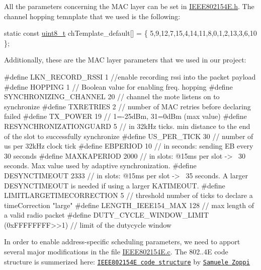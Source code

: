 All the parameters concerning the M\+AC layer can be set in \hyperlink{_i_e_e_e802154_e_8h}{I\+E\+E\+E802154\+E.\+h}. The channel hopping temnplate that we used is the following\+:


\begin{DoxyCodeInclude}
\textcolor{keyword}{static} \textcolor{keyword}{const} \hyperlink{_p_e___types_8h_aba7bc1797add20fe3efdf37ced1182c5}{uint8\_t} chTemplate\_default[] = \{
   5,9,12,7,15,4,14,11,8,0,1,2,13,3,6,10
\};
\end{DoxyCodeInclude}
 Additionally, these are the M\+AC layer parameters that we used in our project\+:


\begin{DoxyCodeInclude}
\textcolor{preprocessor}{#define LKN\_RECORD\_RSSI               1 //enable recording rssi into the packet payload}
\textcolor{preprocessor}{#define HOPPING                      1 // Boolean value for enabling freq. hopping}
\textcolor{preprocessor}{#define SYNCHRONIZING\_CHANNEL       20 // channel the mote listens on to synchronize}
\textcolor{preprocessor}{#define TXRETRIES                    2 // number of MAC retries before declaring failed}
\textcolor{preprocessor}{#define TX\_POWER                     19 // 1=-25dBm, 31=0dBm (max value)}
\textcolor{preprocessor}{#define RESYNCHRONIZATIONGUARD       5 // in 32kHz ticks. min distance to the end of the slot to
       successfully synchronize}
\textcolor{preprocessor}{#define US\_PER\_TICK                 30 // number of us per 32kHz clock tick}
\textcolor{preprocessor}{#define EBPERIOD                    10 // in seconds: sending EB every 30 seconds}
\textcolor{preprocessor}{#define MAXKAPERIOD               2000 // in slots: @15ms per slot -> ~30 seconds. Max value used by
       adaptive synchronization.}
\textcolor{preprocessor}{#define DESYNCTIMEOUT             2333 // in slots: @15ms per slot -> ~35 seconds. A larger DESYNCTIMEOUT
       is needed if using a larger KATIMEOUT.}
\textcolor{preprocessor}{#define LIMITLARGETIMECORRECTION     5 // threshold number of ticks to declare a timeCorrection "large"}
\textcolor{preprocessor}{#define LENGTH\_IEEE154\_MAX         128 // max length of a valid radio packet}
\textcolor{preprocessor}{#define DUTY\_CYCLE\_WINDOW\_LIMIT    (0xFFFFFFFF>>1) // limit of the dutycycle window}
\end{DoxyCodeInclude}


In order to enable address-\/specific scheduling parameters, we need to apport several major modifications in the file \hyperlink{_i_e_e_e802154_e_8c}{I\+E\+E\+E802154\+E.\+c}. The 802..\+4E code structure is summerized here\+: \href{https://www.mindmeister.com/656557809/ieee802154e-code-structure}{\tt I\+E\+E\+E802154E code structure} by \href{https://www.mindmeister.com/users/channel/12733408}{\tt Samuele Zoppi}

